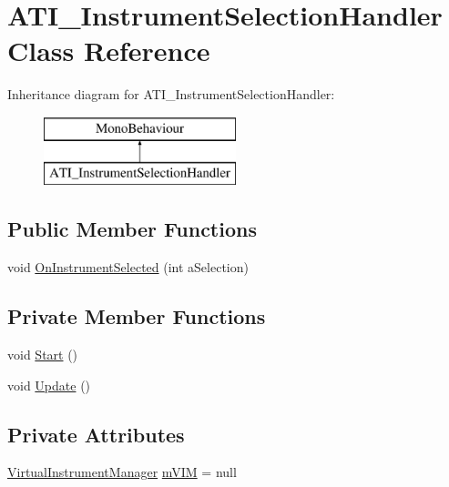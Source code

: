 \hypertarget{class_a_t_i___instrument_selection_handler}{}\section{A\+T\+I\+\_\+\+Instrument\+Selection\+Handler Class Reference}
\label{class_a_t_i___instrument_selection_handler}
Inheritance diagram for A\+T\+I\+\_\+\+Instrument\+Selection\+Handler\+:\begin{figure}[H]
\begin{center}
\leavevmode
\includegraphics[height=2.000000cm]{class_a_t_i___instrument_selection_handler}
\end{center}
\end{figure}
\subsection*{Public Member Functions}
\begin{DoxyCompactItemize}
\item 
void \hyperlink{class_a_t_i___instrument_selection_handler_af9ac3dae1f7938a64d9ecdee529ee677}{On\+Instrument\+Selected} (int a\+Selection)
\end{DoxyCompactItemize}
\subsection*{Private Member Functions}
\begin{DoxyCompactItemize}
\item 
void \hyperlink{class_a_t_i___instrument_selection_handler_a5c6b182a8c8be5d409a2b17e6d8f67a2}{Start} ()
\item 
void \hyperlink{class_a_t_i___instrument_selection_handler_a725510a41c1f4665e3874029486aab99}{Update} ()
\end{DoxyCompactItemize}
\subsection*{Private Attributes}
\begin{DoxyCompactItemize}
\item 
\hyperlink{class_virtual_instrument_manager}{Virtual\+Instrument\+Manager} \hyperlink{class_a_t_i___instrument_selection_handler_a744213ecae613372020009bc5c9688c8}{m\+V\+IM} = null
\end{DoxyCompactItemize}


